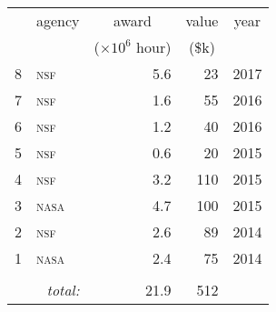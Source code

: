 \begin{tabular}{rlrrr}

\toprule & \multicolumn{1}{c}{agency} & \multicolumn{1}{c}{award}  & \multicolumn{1}{c}{value} & \multicolumn{1}{c}{year} \\ 
&  & \multicolumn{1}{c}{($\times10^6$ hour)} & \multicolumn{1}{c}{(\$k)} &  \\ \midrule

8  &  \textsc{\MakeTextLowercase{NSF}}  &  5.6  &  23  &  2017\\

7  &  \textsc{\MakeTextLowercase{NSF}}  &  1.6  &  55  &  2016\\

6  &  \textsc{\MakeTextLowercase{NSF}}  &  1.2  &  40  &  2016\\

5  &  \textsc{\MakeTextLowercase{NSF}}  &  0.6  &  20  &  2015\\

4  &  \textsc{\MakeTextLowercase{NSF}}  &  3.2  &  110  &  2015\\

3  &  \textsc{\MakeTextLowercase{NASA}}  &  4.7  &  100  &  2015\\

2  &  \textsc{\MakeTextLowercase{NSF}}  &  2.6  &  89  &  2014\\

1  &  \textsc{\MakeTextLowercase{NASA}}  &  2.4  &  75  &  2014\\

\\[-0.5ex] \multicolumn{2}{r}{\textit{total:}} & 21.9  & 512 & \\\bottomrule\end{tabular}
